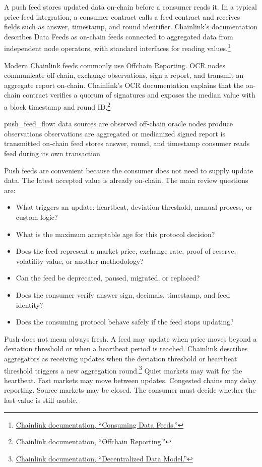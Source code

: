 A push feed stores updated data on-chain before a consumer reads it. In a typical price-feed integration, a consumer contract calls a feed contract and receives fields such as answer, timestamp, and round identifier. Chainlink's documentation describes Data Feeds as on-chain feeds connected to aggregated data from independent node operators, with standard interfaces for reading values.\footnote{\href{https://docs.chain.link/data-feeds/getting-started}{Chainlink documentation, ``Consuming Data Feeds.''}}

Modern Chainlink feeds commonly use Offchain Reporting. OCR nodes communicate off-chain, exchange observations, sign a report, and transmit an aggregate report on-chain. Chainlink's OCR documentation explains that the on-chain contract verifies a quorum of signatures and exposes the median value with a block timestamp and round ID.\footnote{\href{https://docs.chain.link/architecture-overview/off-chain-reporting}{Chainlink documentation, ``Offchain Reporting.''}}

\begin{codeblock}
push_feed_flow:
    data sources are observed off-chain
    oracle nodes produce observations
    observations are aggregated or medianized
    signed report is transmitted on-chain
    feed stores answer, round, and timestamp
    consumer reads feed during its own transaction
\end{codeblock}

Push feeds are convenient because the consumer does not need to supply update data. The latest accepted value is already on-chain. The main review questions are:

\begin{itemize}
\item What triggers an update: heartbeat, deviation threshold, manual process, or custom logic?
\item What is the maximum acceptable age for this protocol decision?
\item Does the feed represent a market price, exchange rate, proof of reserve, volatility value, or another methodology?
\item Can the feed be deprecated, paused, migrated, or replaced?
\item Does the consumer verify answer sign, decimals, timestamp, and feed identity?
\item Does the consuming protocol behave safely if the feed stops updating?
\end{itemize}

Push does not mean always fresh. A feed may update when price moves beyond a deviation threshold or when a heartbeat period is reached. Chainlink describes aggregators as receiving updates when the deviation threshold or heartbeat threshold triggers a new aggregation round.\footnote{\href{https://docs.chain.link/architecture-overview/architecture-decentralized-model}{Chainlink documentation, ``Decentralized Data Model.''}} Quiet markets may wait for the heartbeat. Fast markets may move between updates. Congested chains may delay reporting. Source markets may be closed. The consumer must decide whether the last value is still usable.

